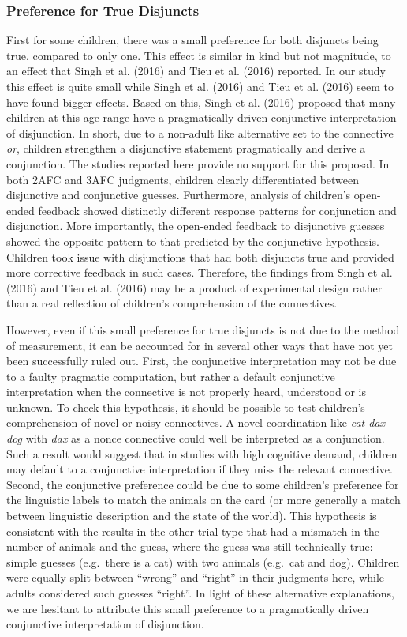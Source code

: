 \documentclass[floatsintext,man]{apa6}
\theoremstyle{definition}
\theoremstyle{definition}
\theoremstyle{definition}
\theoremstyle{remark}
\begin{document}
\subsubsection{Preference for True Disjuncts}\label{conjunctive}

First for some children, there was a small preference for both disjuncts
being true, compared to only one. This effect is similar in kind but not
magnitude, to an effect that Singh et al. (2016) and Tieu et al. (2016)
reported. In our study this effect is quite small while Singh et al.
(2016) and Tieu et al. (2016) seem to have found bigger effects. Based
on this, Singh et al. (2016) proposed that many children at this
age-range have a pragmatically driven conjunctive interpretation of
disjunction. In short, due to a non-adult like alternative set to the
connective \emph{or}, children strengthen a disjunctive statement
pragmatically and derive a conjunction. The studies reported here
provide no support for this proposal. In both 2AFC and 3AFC judgments,
children clearly differentiated between disjunctive and conjunctive
guesses. Furthermore, analysis of children's open-ended feedback showed
distinctly different response patterns for conjunction and disjunction.
More importantly, the open-ended feedback to disjunctive guesses showed
the opposite pattern to that predicted by the conjunctive hypothesis.
Children took issue with disjunctions that had both disjuncts true and
provided more corrective feedback in such cases. Therefore, the findings
from Singh et al. (2016) and Tieu et al. (2016) may be a product of
experimental design rather than a real reflection of children's
comprehension of the connectives.

However, even if this small preference for true disjuncts is not due to
the method of measurement, it can be accounted for in several other ways
that have not yet been successfully ruled out. First, the conjunctive
interpretation may not be due to a faulty pragmatic computation, but
rather a default conjunctive interpretation when the connective is not
properly heard, understood or is unknown. To check this hypothesis, it
should be possible to test children's comprehension of novel or noisy
connectives. A novel coordination like \emph{cat dax dog} with
\emph{dax} as a nonce connective could well be interpreted as a
conjunction. Such a result would suggest that in studies with high
cognitive demand, children may default to a conjunctive interpretation
if they miss the relevant connective. Second, the conjunctive preference
could be due to some children's preference for the linguistic labels to
match the animals on the card (or more generally a match between
linguistic description and the state of the world). This hypothesis is
consistent with the results in the other trial type that had a mismatch
in the number of animals and the guess, where the guess was still
technically true: simple guesses (e.g.~there is a cat) with two animals
(e.g.~cat and dog). Children were equally split between \enquote{wrong}
and \enquote{right} in their judgments here, while adults considered
such guesses \enquote{right}. In light of these alternative
explanations, we are hesitant to attribute this small preference to a
pragmatically driven conjunctive interpretation of disjunction.
\end{document}
